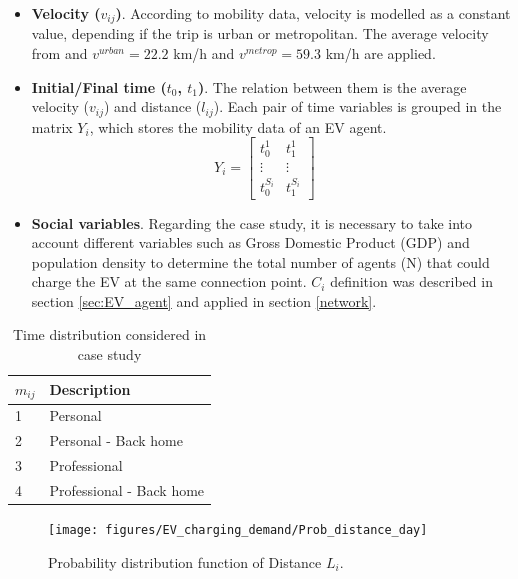 \documentclass[a4paper,11pt,twoside,openright]{report}
\begin{document}
\begin{itemize}
	\item \textbf{Velocity ($v_{ij}$)}. According to mobility data, velocity is modelled as a constant value, depending if the trip is urban or metropolitan. The average velocity from \cite{EMQ2006} and $v^{urban}=22.2$ km/h and $v^{metrop}=59.3$ km/h are applied.
	
	\item \textbf{Initial/Final time ($t_{0}$, $t_{1}$)}. The relation between them is the average velocity ($v_{ij}$) and distance ($l_{ij}$). Each pair of time variables is grouped in the matrix $Y_{i}$, which stores the mobility data of an EV agent.
	\begin{equation*} 
	Y_{i}=
	\begin{bmatrix}
	t_{0}^{1} & t_{1}^{1} \\
	\vdots & \vdots \\
	t_{0}^{S_{i}} & t_{1}^{S_{i}}
	\end{bmatrix}
	\quad
	\end{equation*}
	
	\item \textbf{Social variables}. Regarding the case study, it is necessary to take into account different variables such as Gross Domestic Product (GDP) and population density to determine the total number of agents (N) that could charge the EV at the same connection point. $C_{i}$ definition was described in section \ref{sec:EV_agent} and applied in section \ref{network}.
\end{itemize}

\begin{table}[htbp]
	\centering
	\caption{Time distribution considered in case study}
	\label{tab:mij}
	\begin{tabular}{ll}
		{\bf $m_{ij}$} & {\bf Description} \\
		\hline
		1 & Personal \\
		
		2 & Personal - Back home   \\
		
		3 & Professional \\
		
		4 & Professional - Back home \\
		\hline
	\end{tabular}  
\end{table}

\begin{figure}[h!]
	\centering
	\texttt{[image: figures/EV\_charging\_demand/Prob\_distance\_day]} 
	\caption{Probability distribution function of Distance $L_{i}$. \cite{Cetelem_Distancia}
		\label{fig:Li}}
\end{figure}
\end{document}
